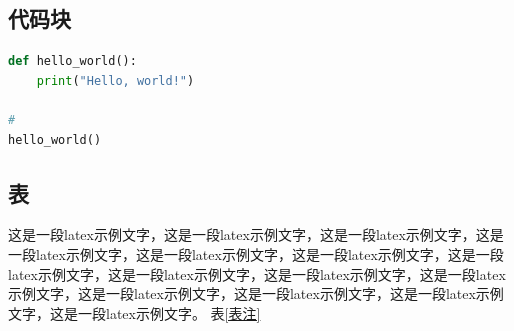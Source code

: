 \documentclass{template.cls} %
\begin{document}
\begin{multicols}{2}

\subsection{代码块}
\begin{lstlisting}[language=Python, caption=示例代码, label=code:example]
def hello_world():
    print("Hello, world!")

# 
hello_world()
\end{lstlisting}

\subsection{表}
这是一段latex示例文字，这是一段latex示例文字，这是一段latex示例文字，这是一段latex示例文字，这是一段latex示例文字，这是一段latex示例文字，这是一段latex示例文字，这是一段latex示例文字，这是一段latex示例文字，这是一段latex示例文字，这是一段latex示例文字，这是一段latex示例文字，这是一段latex示例文字，这是一段latex示例文字。
表\ref{表注}
\begin{table}[H]
  \centering
  \caption{引用名}
  \label{表注}
  \small
\end{table}
    
    
    
    
    \end{multicols}
    
\end{document}

